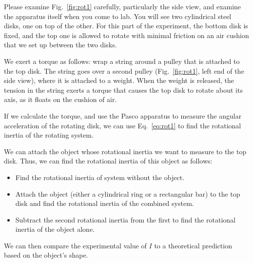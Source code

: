 Please examine Fig.~\ref{fig:rot1} carefully, particularly the side
view, and examine the apparatus itself when you come to lab.  You will
see two cylindrical steel disks, one on top of the other.  For this
part of the experiment, the bottom disk is fixed, and the top one is
allowed to rotate with minimal friction on an air cushion that we
set up between the two disks.

We exert a torque as follows:  wrap a string around a pulley that
is attached to the top disk.  The string goes over a second pulley
(Fig.~\ref{fig:rot1}, left end of the side view), where it is attached to a weight.  When
the weight is released, the tension in the string exerts a torque 
that
causes the top disk to rotate about its axis, as it floats on the
cushion of air.

If we calculate the torque, and use the Pasco apparatus to measure the
angular acceleration of the rotating disk, we can use
Eq.~\ref{eq:rot1} to find the rotational inertia of the rotating
system.


We can attach the object whose rotational inertia we want to measure
to the top disk.  Thus, we can find the rotational inertia of
this object as follows:
\begin{itemize}
\item Find the rotational inertia of system without the object.
%
\item Attach the object (either a cylindrical ring or a
rectangular bar) to the top disk and find the rotational inertia of
the combined system.
%
\item Subtract the second rotational inertia from the first to find
the rotational inertia of the object alone.
\end{itemize}
We can then compare the experimental value of $I$ to a theoretical
prediction based on the object's shape.

